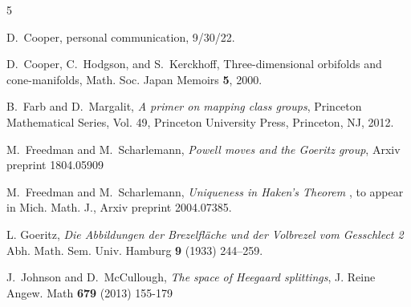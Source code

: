 \documentclass[12pt]{amsart}
\begin{document}
\begin{thebibliography}{5}

%
%


 D.~Cooper, personal communication, 9/30/22.


 D.~Cooper, C.~Hodgson, and S.~Kerckhoff, Three-dimensional orbifolds and cone-manifolds, Math. Soc. Japan Memoirs {\bf 5}, 2000.

  B.~Farb and D.~Margalit, {\em A primer on mapping class groups}, Princeton
Mathematical Series, Vol. 49, Princeton University Press, Princeton, NJ, 2012. 

 M.~Freedman and M.~Scharlemann, 
{\em Powell moves and the Goeritz group}, Arxiv preprint 1804.05909

 M.~Freedman and M.~Scharlemann, 
{\em Uniqueness in Haken's Theorem} , to appear in Mich. Math. J., Arxiv preprint 2004.07385.


 L. Goeritz,
{\em Die Abbildungen der Brezelfl\"ache und der Volbrezel vom 
Gesschlect 2} Abh. Math. Sem. Univ. Hamburg {\bf 9} (1933) 244--259.

%
 J.~Johnson and D.~McCullough,  {\em The space of Heegaard splittings}, J. Reine Angew. Math {\bf 679} (2013) 155-179

%


\end{thebibliography}
\end{document}
